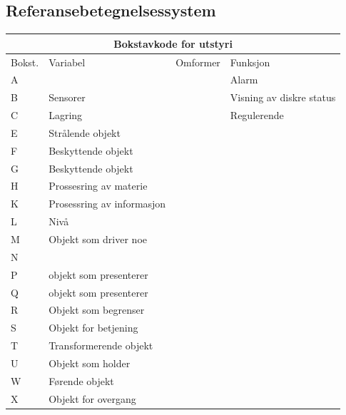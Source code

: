 \documentclass[10pt,a5paper]{article}
\begin{document}
\vskip 5pt

\subsection{Referansebetegnelsessystem}
\small
\begin{center}
\begin{tabular}{ | m{1cm} | m{2.5cm}| m{2cm} | m{2.5cm} |} 
\hline
\multicolumn{4}{|c|}{Bokstavkode for utstyri} \\
\hline
	Bokst. & Variabel& Omformer & Funksjon \\ 
\hline
	A&&&Alarm\\
\hline
	B&Sensorer&&Visning av diskre status\\
\hline
	C&Lagring&&Regulerende\\
\hline
	E&Strålende objekt&&\\
\hline
	F&Beskyttende objekt&&\\
\hline
	G&Beskyttende objekt&&\\
\hline
	H&Prossesring av materie&&\\
	\hline
	K&Prosessring av informasjon&&\\
	\hline
	L&Nivå&&\\
	\hline
	M&Objekt som driver noe&&\\
	\hline
	N&&&\\
	\hline
	P&objekt som presenterer&&\\
	\hline
	Q&objekt som presenterer&&\\
	\hline
	R&Objekt som begrenser&&\\
	\hline
	S&Objekt for betjening &&\\
	\hline
	T&Transformerende objekt&&\\
	\hline
	U&Objekt som holder&&\\
	\hline
	W&Førende objekt&&\\
	\hline
	X&Objekt for overgang&&\\
	\hline
\hline
\end{tabular}
\end{center}
\normalsize
\vfil \eject
\end{document}
